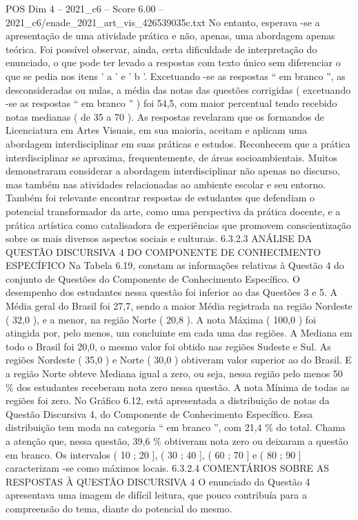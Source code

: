 \begin{textsample}{POS Dim 4 – 2021\_c6 – Score 6.00 – 2021\_c6/enade\_2021\_art\_vis\_426539035c.txt}
No entanto, esperava -se a apresentação de uma atividade prática e não, apenas, uma abordagem apenas teórica.
Foi possível observar, ainda, certa dificuldade de interpretação do enunciado, o que pode ter levado a respostas com texto único sem diferenciar o que se pedia nos itens ' a ' e ' b '.
Excetuando -se as respostas “ em branco ”, as desconsideradas ou nulas, a média das notas das questões corrigidas ( excetuando -se as respostas “ em branco ” ) foi 54,5, com maior percentual tendo recebido notas medianas ( de 35 a 70 ).
As respostas revelaram que os formandos de Licenciatura em Artes Visuais, em sua maioria, aceitam e aplicam uma abordagem interdisciplinar em suas práticas e estudos.
Reconhecem que a prática interdisciplinar se aproxima, frequentemente, de áreas socioambientais.
Muitos demonstraram considerar a abordagem interdisciplinar não apenas no discurso, mas também nas atividades relacionadas ao ambiente escolar e seu entorno.
Também foi relevante encontrar respostas de estudantes que defendiam o potencial transformador da arte, como uma perspectiva da prática docente, e a prática artística como catalisadora de experiências que promovem conscientização sobre os mais diversos aspectos sociais e culturais. 6.3.2.3 ANÁLISE DA QUESTÃO DISCURSIVA 4 DO COMPONENTE DE CONHECIMENTO ESPECÍFICO Na Tabela 6.19, constam as informações relativas à Questão 4 do conjunto de Questões do Componente de Conhecimento Específico.
O desempenho dos estudantes nessa questão foi inferior ao das Questões 3 e 5.
A Média geral do Brasil foi 27,7, sendo a maior Média registrada na região Nordeste ( 32,0 ), e a menor, na região Norte ( 20,8 ).
A nota Máxima ( 100,0 ) foi atingida por, pelo menos, um concluinte em cada uma das regiões.
A Mediana em todo o Brasil foi 20,0, o mesmo valor foi obtido nas regiões Sudeste e Sul.
As regiões Nordeste ( 35,0 ) e Norte ( 30,0 ) obtiveram valor superior ao do Brasil.
E a região Norte obteve Mediana igual a zero, ou seja, nessa região pelo menos 50 \% dos estudantes receberam nota zero nessa questão.
A nota Mínima de todas as regiões foi zero.
No Gráfico 6.12, está apresentada a distribuição de notas da Questão Discursiva 4, do Componente de Conhecimento Específico.
Essa distribuição tem moda na categoria “ em branco ”, com 21,4 \% do total.
Chama a atenção que, nessa questão, 39,6 \% obtiveram nota zero ou deixaram a questão em branco.
Os intervalos ( 10 ; 20 ], ( 30 ; 40 ], ( 60 ; 70 ] e ( 80 ; 90 ] caracterizam -se como máximos locais. 6.3.2.4 COMENTÁRIOS SOBRE AS RESPOSTAS À QUESTÃO DISCURSIVA 4 O enunciado da Questão 4 apresentava uma imagem de difícil leitura, que pouco contribuía para a compreensão do tema, diante do potencial do mesmo.

\end{textsample}
